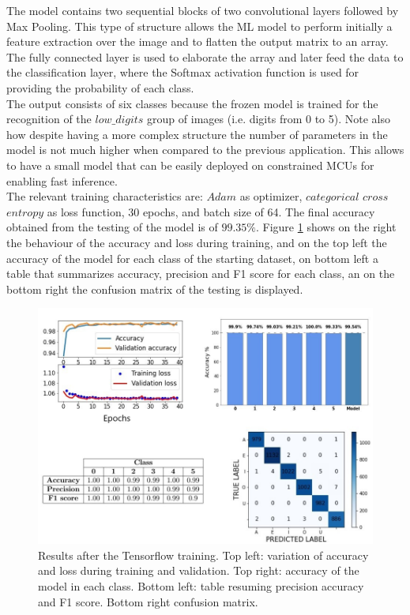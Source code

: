 \documentclass[12pt]{report}
\begin{document}
The model contains two sequential blocks of two convolutional layers followed by Max Pooling. This type of structure allows the ML model to perform initially a feature extraction over the image and to flatten the output matrix to an array. The fully connected layer is used to elaborate the array and later feed the data to the classification layer, where the Softmax activation function is used for providing the probability of each class.\\
The output consists of six classes because the frozen model is trained for the recognition of the $low\_ digits$ group of images (i.e. digits from 0 to 5). Note also how despite having a more complex structure the number of parameters in the model is not much higher when compared to the previous application. This allows to have a small model that can be easily deployed on constrained MCUs for enabling fast inference. \\
The relevant training characteristics are: $Adam$ as optimizer, $categorical$ $cross$ $entropy$ as loss function, 30 epochs, and batch size of 64. The final accuracy obtained from the testing of the model is of $99.35\%$. Figure \ref{fig:training_mnist} shows on the right the behaviour of the accuracy and loss during training, and on the top left the accuracy of the model for each class of the starting dataset, on bottom left a table that summarizes accuracy, precision and F1 score for each class, an on the bottom right the confusion matrix of the testing is displayed.\\

\begin{figure}[h!]
    \centering
    \includegraphics[width=130mm]{Figures/Chapter4/training_digits.jpg} 
    \caption{Results after the Tensorflow training. Top left: variation of accuracy and loss during training and validation. Top right: accuracy of the model in each class. Bottom left: table resuming precision accuracy and F1 score. Bottom right confusion matrix.}
    \label{fig:training_mnist}    
\end{figure}
\end{document}
